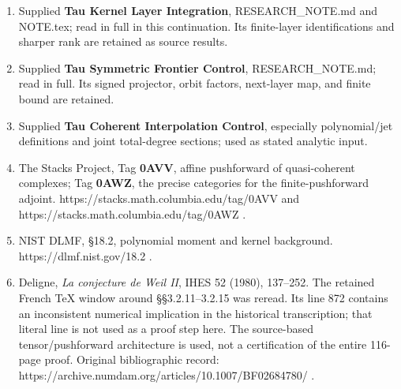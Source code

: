 \documentclass[
]{article}
\providecommand{\tightlist}{%
  \setlength{\itemsep}{0pt}\setlength{\parskip}{0pt}}
\begin{document}
\begin{enumerate}
\def\labelenumi{\arabic{enumi}.}
\tightlist
\item
  Supplied \textbf{Tau Kernel Layer Integration}, RESEARCH\_NOTE.md and
  NOTE.tex; read in full in this continuation. Its finite-layer
  identifications and sharper rank are retained as source results.
\item
  Supplied \textbf{Tau Symmetric Frontier Control}, RESEARCH\_NOTE.md;
  read in full. Its signed projector, orbit factors, next-layer map, and
  finite bound are retained.
\item
  Supplied \textbf{Tau Coherent Interpolation Control}, especially
  polynomial/jet definitions and joint total-degree sections; used as
  stated analytic input.
\item
  The Stacks Project, Tag \textbf{0AVV}, affine pushforward of
  quasi-coherent complexes; Tag \textbf{0AWZ}, the precise categories
  for the finite-pushforward adjoint.
  https://stacks.math.columbia.edu/tag/0AVV and
  https://stacks.math.columbia.edu/tag/0AWZ .
\item
  NIST DLMF, §18.2, polynomial moment and kernel background.
  https://dlmf.nist.gov/18.2 .
\item
  Deligne, \emph{La conjecture de Weil II}, IHES 52 (1980), 137--252.
  The retained French TeX window around §§3.2.11--3.2.15 was reread. Its
  line 872 contains an inconsistent numerical implication in the
  historical transcription; that literal line is not used as a proof
  step here. The source-based tensor/pushforward architecture is used,
  not a certification of the entire 116-page proof. Original
  bibliographic record:
  https://archive.numdam.org/articles/10.1007/BF02684780/ .
\end{enumerate}
\end{document}
